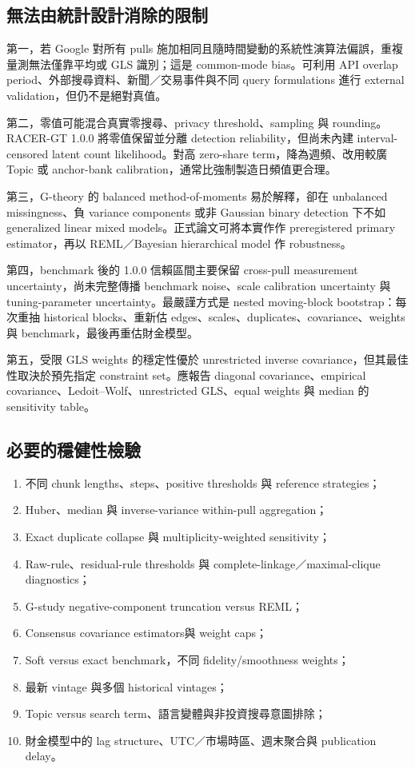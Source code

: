\documentclass[12pt,a4paper,oneside]{article}
\begin{document}
\subsection{無法由統計設計消除的限制}

第一，若 Google 對所有 pulls 施加相同且隨時間變動的系統性演算法偏誤，重複量測無法僅靠平均或 GLS 識別；這是 common-mode bias。可利用 API overlap period、外部搜尋資料、新聞／交易事件與不同 query formulations 進行 external validation，但仍不是絕對真值。

第二，零值可能混合真實零搜尋、privacy threshold、sampling 與 rounding。RACER-GT 1.0.0 將零值保留並分離 detection reliability，但尚未內建 interval-censored latent count likelihood。對高 zero-share term，降為週頻、改用較廣 Topic 或 anchor-bank calibration，通常比強制製造日頻值更合理。

第三，G-theory 的 balanced method-of-moments 易於解釋，卻在 unbalanced missingness、負 variance components 或非 Gaussian binary detection 下不如 generalized linear mixed models。正式論文可將本實作作 preregistered primary estimator，再以 REML／Bayesian hierarchical model 作 robustness。

第四，benchmark 後的 1.0.0 信賴區間主要保留 cross-pull measurement uncertainty，尚未完整傳播 benchmark noise、scale calibration uncertainty 與 tuning-parameter uncertainty。最嚴謹方式是 nested moving-block bootstrap：每次重抽 historical blocks、重新估 edges、scales、duplicates、covariance、weights 與 benchmark，最後再重估財金模型。

第五，受限 GLS weights 的穩定性優於 unrestricted inverse covariance，但其最佳性取決於預先指定 constraint set。應報告 diagonal covariance、empirical covariance、Ledoit--Wolf、unrestricted GLS、equal weights 與 median 的 sensitivity table。

\subsection{必要的穩健性檢驗}

\begin{enumerate}
  \item 不同 chunk lengths、steps、positive thresholds 與 reference strategies；
  \item Huber、median 與 inverse-variance within-pull aggregation；
  \item Exact duplicate collapse 與 multiplicity-weighted sensitivity；
  \item Raw-rule、residual-rule thresholds 與 complete-linkage／maximal-clique diagnostics；
  \item G-study negative-component truncation versus REML；
  \item Consensus covariance estimators與 weight caps；
  \item Soft versus exact benchmark，不同 fidelity/smoothness weights；
  \item 最新 vintage 與多個 historical vintages；
  \item Topic versus search term、語言變體與非投資搜尋意圖排除；
  \item 財金模型中的 lag structure、UTC／市場時區、週末聚合與 publication delay。
\end{enumerate}
\end{document}
